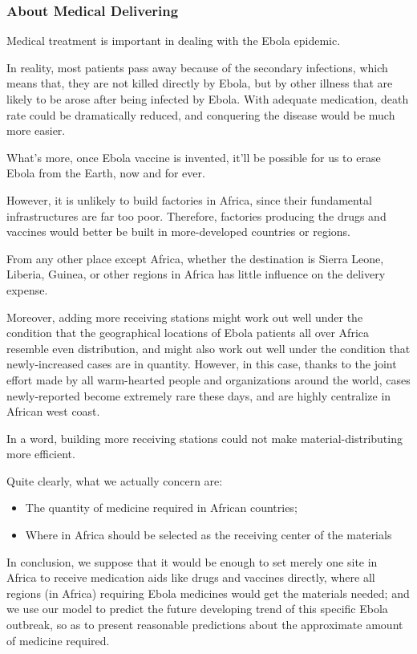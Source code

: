 \documentclass[12pt]{article}
\begin{document}
\subsubsection{About Medical Delivering}

Medical treatment is important in dealing with the Ebola epidemic.

In reality, most patients pass away because of the secondary infections, which means that, they are not killed directly by Ebola, but by other illness that are likely to be arose after being infected by Ebola. With adequate medication, death rate could be dramatically reduced, and conquering the disease would be much more easier.

What's more, once Ebola vaccine is invented, it'll be possible for us to erase Ebola from the Earth, now and for ever.

However, it is unlikely to build factories in Africa, since their fundamental infrastructures are far too poor. Therefore, factories producing the drugs and vaccines would better be built in more-developed countries or regions.

From any other place except Africa, whether the destination is Sierra Leone, Liberia, Guinea, or other regions in Africa has little influence on the delivery expense.

Moreover, adding more receiving stations might work out well under the condition that the geographical locations of Ebola patients all over Africa resemble even distribution, and might also work out well under the condition that newly-increased cases are in quantity. However, in this case, thanks to the joint effort made by all warm-hearted people and organizations around the world, cases newly-reported become extremely rare these days, and are highly centralize in African west coast.

In a word, building more receiving stations could not make material-distributing more efficient.

Quite clearly, what we actually concern are:

\begin{itemize}
\item The quantity of medicine required in African countries;
\item Where in Africa should be selected as the receiving center of the materials
\end{itemize}

In conclusion, we suppose that it would be enough to set merely one site in Africa to receive medication aids like drugs and vaccines directly, where all regions (in Africa) requiring Ebola medicines would get the materials needed; and we use our model to predict the future developing trend of this specific Ebola outbreak, so as to present reasonable predictions about the approximate amount of medicine required.
\end{document}
